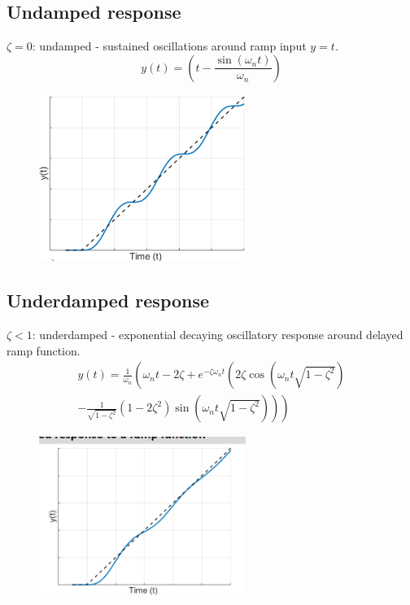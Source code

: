 \documentclass[class=report, crop=false, 12pt,a4paper]{standalone}
\begin{document}
\subsection{Undamped response}
$\zeta = 0$: undamped - sustained oscillations around ramp input $y = t$.
\begin{equation}
  y(t) = \left(t - \frac{\sin(\omega_n t)}{\omega_n}\right)
\end{equation}
\begin{figure}[H]
  \centering
  \includegraphics[width = 0.6\textwidth]{../img/diagram79.png}
\end{figure}
\subsection{Underdamped response}
$\zeta < 1$: underdamped - exponential decaying oscillatory response around delayed ramp function.
\begin{multline}
  y(t) = \frac{1}{\omega_n} \left( \omega_n t - 2\zeta + e^{-\zeta \omega_n t} \left( 2\zeta \cos\left( \omega_n t\sqrt{1 - \zeta^2} \right) \right. \right. \\ 
  \left. \left. - \frac{1}{\sqrt{1-\zeta^2}} \left( 1 - 2\zeta^2 \right) \sin \left( \omega_n t\sqrt{1-\zeta^2} \right) \right) \right)
\end{multline}
\begin{figure}[H]
  \centering
  \includegraphics[width = 0.6\textwidth]{../img/diagram80.png}
\end{figure}
\end{document}
